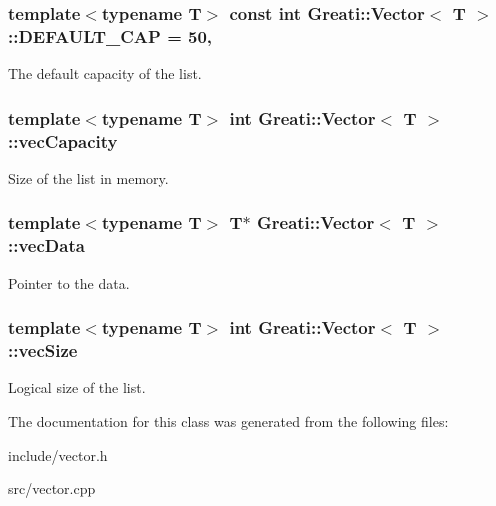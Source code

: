 \subsubsection[{D\+E\+F\+A\+U\+L\+T\+\_\+\+C\+AP}]{\setlength{\rightskip}{0pt plus 5cm}template$<$typename T$>$ const int {\bf Greati\+::\+Vector}$<$ T $>$\+::D\+E\+F\+A\+U\+L\+T\+\_\+\+C\+AP = 50\hspace{0.3cm}{\ttfamily [static]}, {\ttfamily [private]}}\hypertarget{classGreati_1_1Vector_a4f65eea1b021f9ed7a2e068e9022de5a}{}\label{classGreati_1_1Vector_a4f65eea1b021f9ed7a2e068e9022de5a}
The default capacity of the list. 
\subsubsection[{vec\+Capacity}]{\setlength{\rightskip}{0pt plus 5cm}template$<$typename T$>$ int {\bf Greati\+::\+Vector}$<$ T $>$\+::vec\+Capacity\hspace{0.3cm}{\ttfamily [private]}}\hypertarget{classGreati_1_1Vector_a54359e7c9f68cb4ea6cae8be750b989a}{}\label{classGreati_1_1Vector_a54359e7c9f68cb4ea6cae8be750b989a}
Size of the list in memory. 
\subsubsection[{vec\+Data}]{\setlength{\rightskip}{0pt plus 5cm}template$<$typename T$>$ T$\ast$ {\bf Greati\+::\+Vector}$<$ T $>$\+::vec\+Data\hspace{0.3cm}{\ttfamily [private]}}\hypertarget{classGreati_1_1Vector_a95cfc9dbb67abb214cc2516c39c68d23}{}\label{classGreati_1_1Vector_a95cfc9dbb67abb214cc2516c39c68d23}
Pointer to the data. 
\subsubsection[{vec\+Size}]{\setlength{\rightskip}{0pt plus 5cm}template$<$typename T$>$ int {\bf Greati\+::\+Vector}$<$ T $>$\+::vec\+Size\hspace{0.3cm}{\ttfamily [private]}}\hypertarget{classGreati_1_1Vector_a037b83266461e0b25f963422533efdf0}{}\label{classGreati_1_1Vector_a037b83266461e0b25f963422533efdf0}
Logical size of the list. 

The documentation for this class was generated from the following files\+:\begin{DoxyCompactItemize}
\item 
include/vector.\+h\item 
src/vector.\+cpp\end{DoxyCompactItemize}
